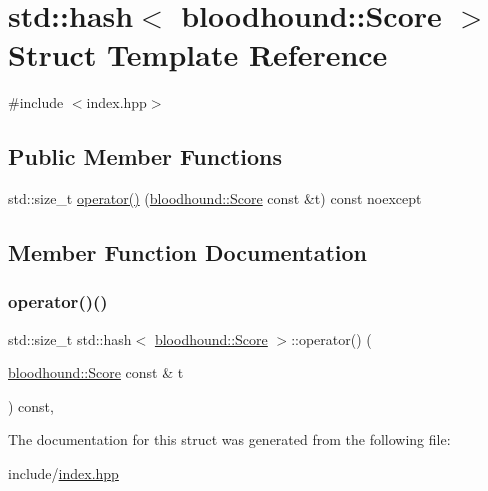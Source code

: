 \hypertarget{structstd_1_1hash_3_01bloodhound_1_1Score_01_4}{}\section{std\+:\+:hash$<$ bloodhound\+:\+:Score $>$ Struct Template Reference}
\label{structstd_1_1hash_3_01bloodhound_1_1Score_01_4}


{\ttfamily \#include $<$index.\+hpp$>$}

\subsection*{Public Member Functions}
\begin{DoxyCompactItemize}
\item 
std\+::size\+\_\+t \hyperlink{structstd_1_1hash_3_01bloodhound_1_1Score_01_4_a8e9e8081ca942b25eafe41f8f76a584b}{operator()} (\hyperlink{structbloodhound_1_1Score}{bloodhound\+::\+Score} const \&t) const noexcept
\end{DoxyCompactItemize}


\subsection{Member Function Documentation}
\mbox{\label{structstd_1_1hash_3_01bloodhound_1_1Score_01_4_a8e9e8081ca942b25eafe41f8f76a584b}} 
\subsubsection{\texorpdfstring{operator()()}{operator()()}}
{\footnotesize\ttfamily std\+::size\+\_\+t std\+::hash$<$ \hyperlink{structbloodhound_1_1Score}{bloodhound\+::\+Score} $>$\+::operator() (\begin{DoxyParamCaption}\item[{\hyperlink{structbloodhound_1_1Score}{bloodhound\+::\+Score} const \&}]{t }\end{DoxyParamCaption}) const\hspace{0.3cm}{\ttfamily [inline]}, {\ttfamily [noexcept]}}



The documentation for this struct was generated from the following file\+:\begin{DoxyCompactItemize}
\item 
include/\hyperlink{index_8hpp}{index.\+hpp}\end{DoxyCompactItemize}
